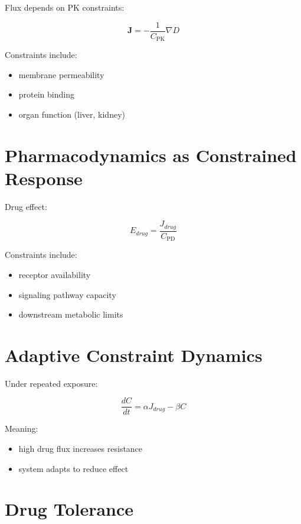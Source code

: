 \documentclass[11pt]{article}
\begin{document}
Flux depends on PK constraints:

\begin{equation}
\mathbf{J} = -\frac{1}{C_{\mathrm{PK}}}\nabla D
\end{equation}

Constraints include:

\begin{itemize}
    \item membrane permeability
    \item protein binding
    \item organ function (liver, kidney)
\end{itemize}

\section{Pharmacodynamics as Constrained Response}

Drug effect:

\begin{equation}
E_{drug} = \frac{J_{drug}}{C_{\mathrm{PD}}}
\end{equation}

Constraints include:

\begin{itemize}
    \item receptor availability
    \item signaling pathway capacity
    \item downstream metabolic limits
\end{itemize}

\section{Adaptive Constraint Dynamics}

Under repeated exposure:

\begin{equation}
\frac{dC}{dt} = \alpha J_{drug} - \beta C
\end{equation}

Meaning:

\begin{itemize}
    \item high drug flux increases resistance
    \item system adapts to reduce effect
\end{itemize}

\section{Drug Tolerance}
\end{document}
